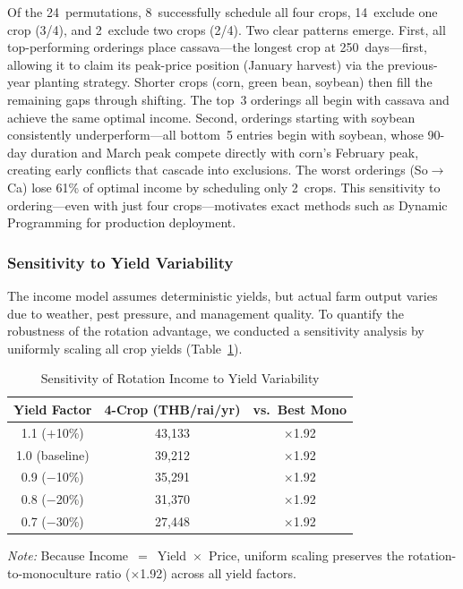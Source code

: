 \documentclass[journal]{IEEEtran}
\begin{document}
Of the 24~permutations, 8~successfully schedule all four crops, 14~exclude one crop (3/4), and 2~exclude two crops (2/4). Two clear patterns emerge. First, all top-performing orderings place cassava---the longest crop at 250~days---first, allowing it to claim its peak-price position (January harvest) via the previous-year planting strategy. Shorter crops (corn, green bean, soybean) then fill the remaining gaps through shifting. The top~3 orderings all begin with cassava and achieve the same optimal income. Second, orderings starting with soybean consistently underperform---all bottom~5 entries begin with soybean, whose 90-day duration and March peak compete directly with corn's February peak, creating early conflicts that cascade into exclusions. The worst orderings (So$\to$Ca) lose 61\% of optimal income by scheduling only 2~crops. This sensitivity to ordering---even with just four crops---motivates exact methods such as Dynamic Programming for production deployment.

\subsubsection{Sensitivity to Yield Variability}
\label{sec:sensitivity}

The income model assumes deterministic yields, but actual farm output varies due to weather, pest pressure, and management quality. To quantify the robustness of the rotation advantage, we conducted a sensitivity analysis by uniformly scaling all crop yields (Table~\ref{tab:sensitivity}).

\begin{table}[htbp]
  \centering
  \caption{Sensitivity of Rotation Income to Yield Variability}
  \label{tab:sensitivity}
  \begin{tabular}{ccc}
    \toprule
    \textbf{Yield Factor} & \textbf{4-Crop (THB/rai/yr)} & \textbf{vs.\ Best Mono} \\
    \midrule
    1.1 ($+$10\%) & 43,133 & $\times$1.92 \\
    1.0 (baseline) & 39,212 & $\times$1.92 \\
    0.9 ($-$10\%)  & 35,291 & $\times$1.92 \\
    0.8 ($-$20\%)  & 31,370 & $\times$1.92 \\
    0.7 ($-$30\%)  & 27,448 & $\times$1.92 \\
    \bottomrule
  \end{tabular}
  \vspace{6pt}
  \par\raggedright\scriptsize\textit{Note:} Because Income~$=$~Yield~$\times$~Price, uniform scaling preserves the rotation-to-monoculture ratio ($\times$1.92) across all yield factors.
\end{table}
\end{document}
